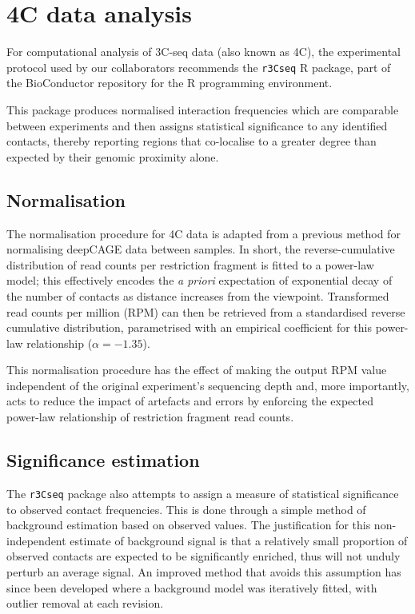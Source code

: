\documentclass[a4paper,11pt,oneside]{book}
\begin{document}
\section{4C data analysis}\label{methods:4c}

For computational analysis of 3C-seq data (also known as 4C), the experimental protocol used by our collaborators recommends the \texttt{r3Cseq} R package,\cite{Stadhouders2013, Thongjuea2013} part of the BioConductor repository\cite{Gentleman2004, Huber2015} for the R programming environment.\cite{Ihaka1996}

This package produces normalised interaction frequencies which are comparable between experiments and then assigns statistical significance to any identified contacts, thereby reporting regions that co-localise to a greater degree than expected by their genomic proximity alone.

\subsection{Normalisation}\label{methods:4cnorm}

The normalisation procedure for 4C data is adapted from a previous method for normalising deepCAGE data between samples.\cite{Balwierz2009} In short, the reverse-cumulative distribution of read counts per restriction fragment is fitted to a power-law model; this effectively encodes the \emph{a priori} expectation of exponential decay of the number of contacts as distance increases from the viewpoint. Transformed read counts per million (RPM) can then be retrieved from a standardised reverse cumulative distribution, parametrised with an empirical coefficient for this power-law relationship ($\alpha = -1.35$).\cite{Thongjuea2013}

This normalisation procedure has the effect of making the output RPM value independent of the original experiment's sequencing depth and, more importantly, acts to reduce the impact of artefacts and errors by enforcing the expected power-law relationship of restriction fragment read counts.

\subsection{Significance estimation}\label{methods:4csignif}

The \texttt{r3Cseq} package\cite{Thongjuea2013} also attempts to assign a measure of statistical significance to observed contact frequencies. This is done through a simple method of background estimation based on observed values. The justification for this non-independent estimate of background signal is that a relatively small proportion of observed contacts are expected to be significantly enriched, thus will not unduly perturb an average signal.\cite{Thongjuea2013} An improved method that avoids this assumption has since been developed where a background model was iteratively fitted, with outlier removal at each revision.\cite{Ay2014}
\end{document}
